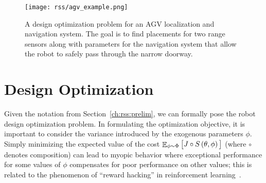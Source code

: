 \begin{figure}[tb]
    \centering
    \texttt{[image: rss/agv\_example.png]}
    \caption{A design optimization problem for an AGV localization and navigation system. The goal is to find placements for two range sensors along with parameters for the navigation system that allow the robot to safely pass through the narrow doorway.}
    \label{ch:rss:fig:agv_example}
\end{figure}

\section{Design Optimization}\label{ch:rss:optimization}

Given the notation from Section~\ref{ch:rss:prelim}, we can formally pose the robot design optimization problem. In formulating the optimization objective, it is important to consider the variance introduced by the exogenous parameters $\phi$. Simply minimizing the expected value of the cost $\mathop{\mathbb{E}}_{\phi \sim \Phi} \big[ J\circ S\left( \theta, \phi \right) \big]$ (where $\circ$ denotes composition) can lead to myopic behavior where exceptional performance for some values of $\phi$ compensates for poor performance on other values; this is related to the phenomenon of ``reward hacking'' in reinforcement learning~\cite{amodei2016_ai_safety}.

